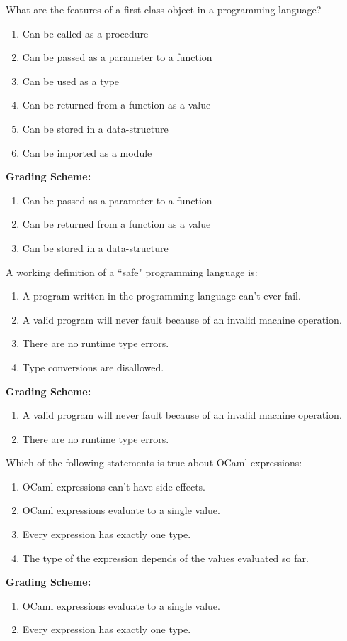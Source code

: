 \documentclass[addpoints,11pt]{exam}
\newcommand{\grade}[1]{{\color{red}\textbf{Grading Scheme:} #1}}
\begin{document}
\begin{questions}
\question What are the features of a first class object in a programming language?
\begin{enumerate}
\item Can be called as a procedure
\item Can be passed as a parameter to a function
\item Can be used as a type
\item Can be returned from a function as a value
\item Can be stored in a data-structure
\item Can be imported as a module
\end{enumerate}
\begin{solution}
\grade{
\begin{enumerate}
\item Can be passed as a parameter to a function
\item Can be returned from a function as a value
\item Can be stored in a data-structure
\end{enumerate}
}
\end{solution}

\question A working definition of a ``safe" programming language is:
\begin{enumerate}
\item A program written in the programming language can't ever fail.
\item A valid program will never fault because of an invalid machine operation.
\item There are no runtime type errors.
\item Type conversions are disallowed.
\end{enumerate}
\begin{solution}
\grade{
\begin{enumerate}
\item A valid program will never fault because of an invalid machine operation.
\item There are no runtime type errors.
\end{enumerate}
}
\end{solution}

\question Which of the following statements is true about OCaml expressions:
\begin{enumerate}
\item OCaml expressions can't have side-effects.
\item OCaml expressions evaluate to a single value.
\item Every expression has exactly one type.
\item The type of the expression depends of the values evaluated so far.
\end{enumerate}
\begin{solution}
\grade{
\begin{enumerate}
\item OCaml expressions evaluate to a single value.
\item Every expression has exactly one type.
\end{enumerate}
}
\end{solution}


\end{questions}
\end{document}
